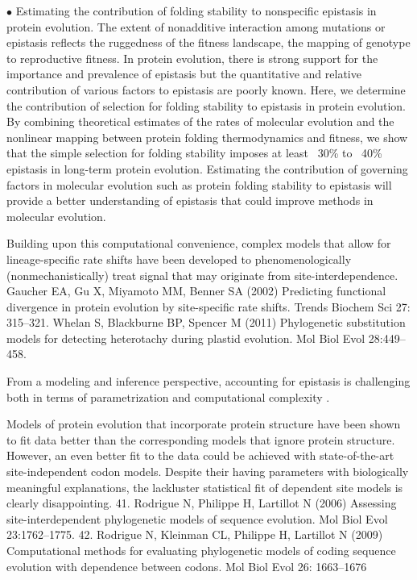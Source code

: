 $\bullet$ Estimating the contribution of folding stability to nonspecific epistasis in protein evolution.
The extent of nonadditive interaction among mutations or epistasis reflects the ruggedness of the fitness landscape, the mapping of genotype to reproductive fitness.
In protein evolution, there is strong support for the importance and prevalence of epistasis but the quantitative and relative contribution of various factors to epistasis are poorly known.
Here, we determine the contribution of selection for folding stability to epistasis in protein evolution.
By combining theoretical estimates of the rates of molecular evolution and the nonlinear mapping between protein folding thermodynamics and fitness, we show that the simple selection for folding stability imposes at least ~30\% to ~40\% epistasis in long-term protein evolution.
Estimating the contribution of governing factors in molecular evolution such as protein folding stability to epistasis will provide a better understanding of epistasis that could improve methods in molecular evolution.
\citet{Dasmeh2018}

Building upon this computational convenience, complex models that allow for lineage-specific rate shifts have been developed to phenomenologically (nonmechanistically) treat signal that may originate from site-interdependence.
Gaucher EA, Gu X, Miyamoto MM, Benner SA (2002) Predicting functional divergence in protein evolution by site-specific rate shifts. Trends Biochem Sci 27: 315–321.
Whelan S, Blackburne BP, Spencer M (2011) Phylogenetic \gls{substitution} models for detecting heterotachy during plastid evolution. Mol Biol Evol 28:449–458.

From a modeling and inference perspective, accounting for epistasis is challenging both in terms of parametrization and computational complexity \citep{Rodrigue2005, Manhart2014}.

Models of protein evolution that incorporate protein structure have been shown to fit data better than the corresponding models that ignore protein structure.
However, an even better fit to the data could be achieved with state-of-the-art site-independent \gls{codon} models.
Despite their having parameters with biologically meaningful explanations, the lackluster statistical fit of dependent site models is clearly disappointing.
41. Rodrigue N, Philippe H, Lartillot N (2006) Assessing site-interdependent phylogenetic models of sequence evolution. Mol Biol Evol 23:1762–1775.
42. Rodrigue N, Kleinman CL, Philippe H, Lartillot N (2009) Computational methods for evaluating phylogenetic models of coding sequence evolution with dependence between \glspl{codon}. Mol Biol Evol 26: 1663–1676

